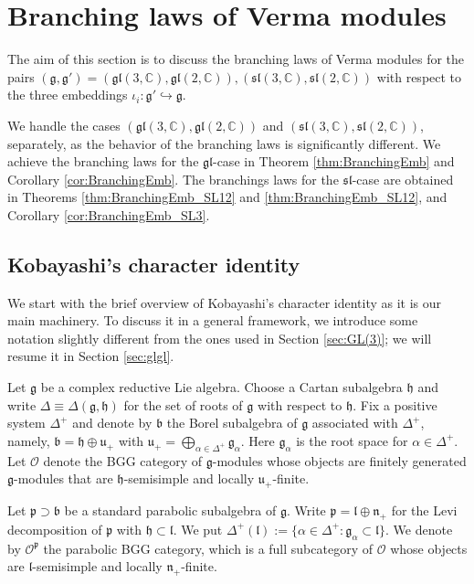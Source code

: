 \documentclass[a4paper,11pt,reqno]{amsart}
\newcommand{\frakg}{\mathfrak{g}}
\newcommand{\frakh}{\mathfrak{h}}
\newcommand{\frakn}{\mathfrak{n}}
\newcommand{\frakp}{\mathfrak{p}}
\newcommand{\fraku}{\mathfrak{u}}
\newcommand{\0}{{\bf 0}}
\newcommand{\C}{\mathbb{C}}
\newcommand{\1}{{\bf 1}}
\newcommand{\frakb}{{\mathfrak b}}
\newcommand{\frakl}{{\mathfrak l}}
\newcommand{\fraksl}{{\mathfrak{sl}}}
\theoremstyle{plain}
\theoremstyle{definition}
\numberwithin{equation}{section}
\theoremstyle{definition}
\begin{document}
\section{Branching laws of Verma modules}
\label{sec:GVM}

The aim of this section is to discuss
the branching laws of  Verma modules
for the pairs $(\mathfrak{g}, \mathfrak{g}')
= (\mathfrak{gl}(3,\C), \mathfrak{gl}(2,\C)), 
(\mathfrak{sl}(3,\C), \mathfrak{sl}(2,\C))$
with respect to the three embeddings 
$\iota_{i}\colon \mathfrak{g}' \hookrightarrow \mathfrak{g}$.

We handle the cases
$(\mathfrak{gl}(3,\C), \mathfrak{gl}(2,\C))$ and $(\mathfrak{sl}(3,\C), \mathfrak{sl}(2,\C))$,
separately, as the behavior of the branching laws is significantly different.
We achieve the branching laws for the $\mathfrak{gl}$-case
in Theorem \ref{thm:BranchingEmb} and Corollary \ref{cor:BranchingEmb}.
The branchings laws for the $\fraksl$-case
are obtained in 
Theorems \ref{thm:BranchingEmb_SL12} and
\ref{thm:BranchingEmb_SL12}, and 
Corollary \ref{cor:BranchingEmb_SL3}.

\subsection{Kobayashi's character identity}
\label{sec:character}

We start with the brief overview of Kobayashi's character identity
\cite{Kobayashi12} as it is our main machinery.
To discuss it in a general framework, we introduce some notation
 slightly different from the ones used  in Section \ref{sec:GL(3)};
we will resume it in Section \ref{sec:glgl}.

Let $\frakg$ be a complex reductive Lie algebra. 
Choose a Cartan subalgebra $\frakh$ and 
write $\Delta\equiv \Delta(\frakg, \frakh)$ for the set of roots of $\frakg$ with respect to $\frakh$.
Fix a positive system $\Delta^+$ and denote  by 
$\frakb$ the Borel subalgebra of $\frakg$ associated with $\Delta^+$, namely,
$\frakb = \frakh \oplus \fraku_+$ with $\fraku_+=\bigoplus_{\alpha \in \Delta^+} \frakg_\alpha$. 
Here $\frakg_\alpha$ is the root space
for $\alpha \in \Delta^+$. Let $\mathcal{O}$ denote the BGG category of $\frakg$-modules
whose objects are finitely generated $\frakg$-modules that are $\frakh$-semisimple
and locally $\fraku_+$-finite.

Let $\frakp \supset \frakb$ be a standard parabolic subalgebra of $\frakg$. Write 
$\frakp =\frakl \oplus \frakn_+$ for the Levi decomposition of $\frakp$ with $\frakh \subset \frakl$. 
We put $\Delta^+(\frakl):=\{\alpha \in \Delta^+: \frakg_\alpha \subset \frakl\}$. 
We denote by $\mathcal{O}^\frakp$ the parabolic BGG category, which is a full
subcategory of $\mathcal{O}$ whose objects are $\frakl$-semisimple and locally
$\frakn_+$-finite.
\end{document}
